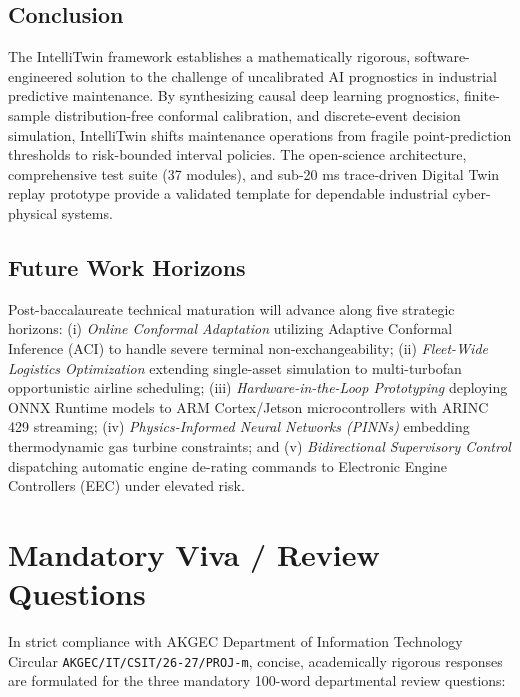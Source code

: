 \documentclass[12pt,a4paper]{article}
\begin{document}
\subsection{Conclusion}
The IntelliTwin framework establishes a mathematically rigorous, software-engineered solution to the challenge of uncalibrated AI prognostics in industrial predictive maintenance. By synthesizing causal deep learning prognostics, finite-sample distribution-free conformal calibration, and discrete-event decision simulation, IntelliTwin shifts maintenance operations from fragile point-prediction thresholds to risk-bounded interval policies. The open-science architecture, comprehensive test suite (37 modules), and sub-20 ms trace-driven Digital Twin replay prototype provide a validated template for dependable industrial cyber-physical systems.

\subsection{Future Work Horizons}
Post-baccalaureate technical maturation will advance along five strategic horizons: (i) \textit{Online Conformal Adaptation} utilizing Adaptive Conformal Inference (ACI) to handle severe terminal non-exchangeability; (ii) \textit{Fleet-Wide Logistics Optimization} extending single-asset simulation to multi-turbofan opportunistic airline scheduling; (iii) \textit{Hardware-in-the-Loop Prototyping} deploying ONNX Runtime models to ARM Cortex/Jetson microcontrollers with ARINC 429 streaming; (iv) \textit{Physics-Informed Neural Networks (PINNs)} embedding thermodynamic gas turbine constraints; and (v) \textit{Bidirectional Supervisory Control} dispatching automatic engine de-rating commands to Electronic Engine Controllers (EEC) under elevated risk.

\section{Mandatory Viva / Review Questions}
In strict compliance with AKGEC Department of Information Technology Circular \texttt{AKGEC/IT/CSIT/26-27/PROJ-m}, concise, academically rigorous responses are formulated for the three mandatory 100-word departmental review questions:
\end{document}
